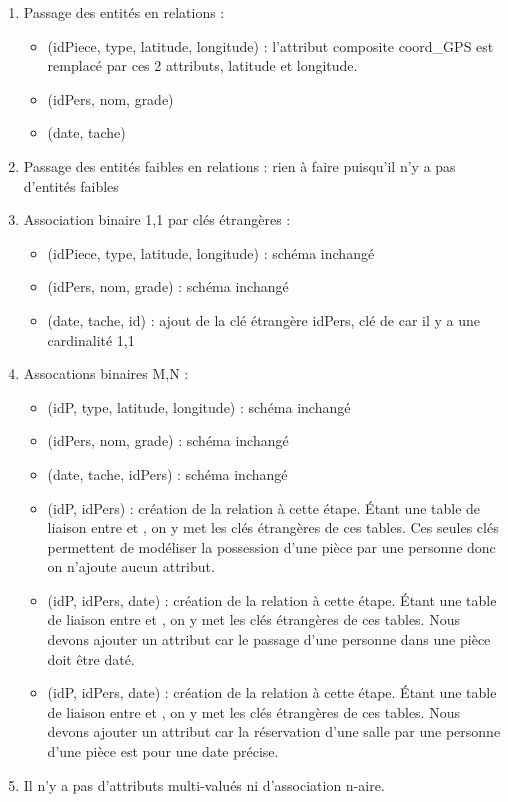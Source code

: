 \begin{enumerate}
	\item Passage des entités en relations :
		\begin{itemize}
			\item {}(idPiece, type, latitude, longitude) : l'attribut composite coord\_GPS est remplacé par ces 2 attributs, latitude et longitude.
			\item {}(idPers, nom, grade)
			\item {}(date, tache) 
		\end{itemize}
	\item Passage des entités faibles en relations : rien à faire puisqu'il n'y a pas d'entités faibles
	\item Association binaire 1,1 par clés étrangères :
		\begin{itemize}
			\item {}(idPiece, type, latitude, longitude) : schéma inchangé
			\item {}(idPers, nom, grade) : schéma inchangé
			\item {}(date, tache, id) : ajout de la clé étrangère idPers, clé de  car il y a une cardinalité 1,1
		\end{itemize}
	\item Assocations binaires M,N :
		\begin{itemize}
			\item {}(idP, type, latitude, longitude) : schéma inchangé
			\item {}(idPers, nom, grade) : schéma inchangé
			\item {}(date, tache, idPers) : schéma inchangé
			\item {}(idP, idPers) : création de la relation  à cette étape. Étant une table de liaison entre  et , on y met les clés étrangères de ces tables. Ces seules clés permettent de modéliser la possession d'une pièce par une personne donc on n'ajoute aucun attribut. 
			\item {}(idP, idPers, date) : création de la relation  à cette étape. Étant une table de liaison entre  et , on y met les clés étrangères de ces tables. Nous devons ajouter un attribut  car le passage d'une personne dans une pièce doit être daté.
			\item {}(idP, idPers, date) : création de la relation  à cette étape. Étant une table de liaison entre  et , on y met les clés étrangères de ces tables. Nous devons ajouter un attribut  car la réservation d'une salle par une personne d'une pièce est pour une date précise.
		\end{itemize}
	\item Il n'y a pas d'attributs multi-valués ni d'association n-aire.
\end{enumerate}

